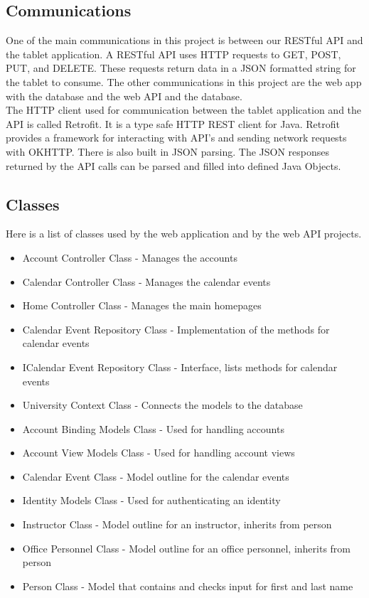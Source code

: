 \subsection{Communications}
One of the main communications in this project is between our RESTful API and the tablet application. A RESTful API uses HTTP requests to GET, POST, PUT, and DELETE. These requests return data in a JSON formatted string for the tablet to consume. The other communications in this project are the web app with the database and the web API and the database.\\

The HTTP client used for communication between the tablet application and the API is called Retrofit. It is a type safe HTTP REST client for Java. Retrofit provides a framework for interacting with API's and sending network requests with OKHTTP. There is also built in JSON parsing.  The JSON responses returned by the API calls can be parsed and filled into defined Java Objects.  
 
 
 
\subsection{Classes}
Here is a list of classes used by the web application and by the web API projects.
\begin{itemize}
\item Account Controller Class - Manages the accounts 
\item Calendar Controller Class - Manages the calendar events
\item Home Controller Class - Manages the main homepages
\item Calendar Event Repository Class - Implementation of the methods for calendar events
\item ICalendar Event Repository Class - Interface, lists methods for calendar events
\item University Context Class - Connects the models to the database
\item Account Binding Models Class - Used for handling accounts
\item Account View Models Class - Used for handling account views
\item Calendar Event Class - Model outline for the calendar events
\item Identity Models Class - Used for authenticating an identity
\item Instructor Class - Model outline for an instructor, inherits from person
\item Office Personnel Class - Model outline for an office personnel, inherits from person
\item Person Class - Model that contains and checks input for first and last name
\end{itemize}

